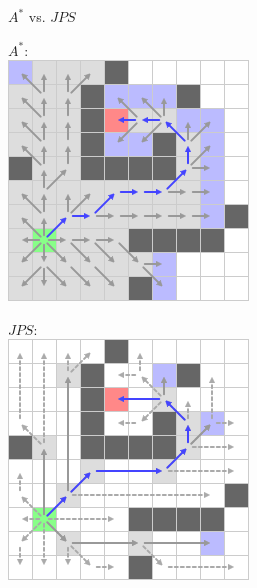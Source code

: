 \documentclass{presentation}
\begin{document}
\begin{frame}{$A^*$ vs. $JPS$}
	\begin{minipage}{0.45\textwidth}
		$A^*$:\\
		\vspace{3mm}
		\includegraphics[width=\textwidth]{figures/A-Stern_geschnitten(241x241)/11.png}
	\end{minipage}%
	\hfill%
	\begin{minipage}{0.45\textwidth}
		$JPS$:\\
		\vspace{3mm}
		\includegraphics[width=\textwidth]{figures/jps_geschnitten/13.png}
	\end{minipage}
\end{frame}
\end{document}
